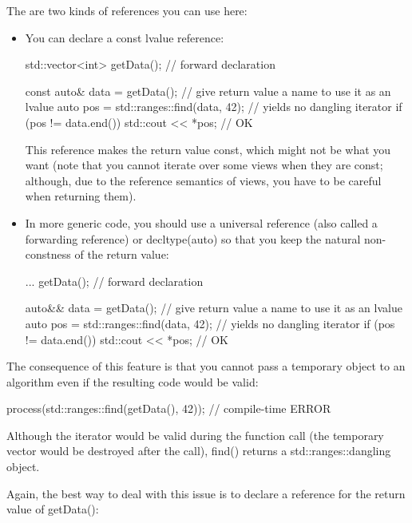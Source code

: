 The are two kinds of references you can use here:

\begin{itemize}
\item
You can declare a const lvalue reference:

\begin{cpp}
std::vector<int> getData(); // forward declaration

const auto& data = getData(); // give return value a name to use it as an lvalue
auto pos = std::ranges::find(data, 42); // yields no dangling iterator
if (pos != data.end()) {
	std::cout << *pos; // OK
}
\end{cpp}

This reference makes the return value const, which might not be what you want (note that you cannot iterate over some views when they are const; although, due to the reference semantics of views, you have to be careful when returning them).

\item
In more generic code, you should use a universal reference (also called a forwarding reference) or decltype(auto) so that you keep the natural non-constness of the return value:

\begin{cpp}
... getData(); // forward declaration

auto&& data = getData(); // give return value a name to use it as an lvalue
auto pos = std::ranges::find(data, 42); // yields no dangling iterator
if (pos != data.end()) {
	std::cout << *pos; // OK
}
\end{cpp}
\end{itemize}

The consequence of this feature is that you cannot pass a temporary object to an algorithm even if the resulting code would be valid:

\begin{cpp}
process(std::ranges::find(getData(), 42)); // compile-time ERROR
\end{cpp}

Although the iterator would be valid during the function call (the temporary vector would be destroyed after the call), find() returns a std::ranges::dangling object.

Again, the best way to deal with this issue is to declare a reference for the return value of getData():

